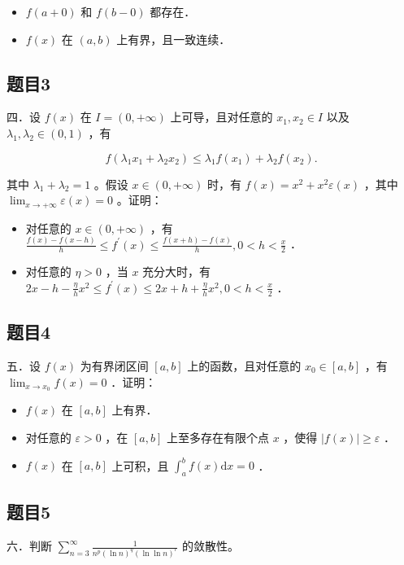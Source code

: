 \documentclass{article}
\begin{document}
\begin{itemize}
  \item[（1）] \(f(a+0)\) 和 \(f(b-0)\) 都存在．
  \item[（2）] \(f(x)\) 在 \((a, b)\) 上有界，且一致连续．
\end{itemize}

\subsection{题目3}
四．设 \(f(x)\) 在 \(I=(0,+\infty)\) 上可导，且对任意的 \(x_{1}, x_{2} \in I\) 以及 \(\lambda_{1}, \lambda_{2} \in(0,1)\) ，有

\[
f\left(\lambda_{1} x_{1}+\lambda_{2} x_{2}\right) \leq \lambda_{1} f\left(x_{1}\right)+\lambda_{2} f\left(x_{2}\right) .
\]

其中 \(\lambda_{1}+\lambda_{2}=1\) 。假设 \(x \in(0,+\infty)\) 时，有 \(f(x)=x^{2}+x^{2} \varepsilon(x)\) ，其中 \(\lim _{x \rightarrow+\infty} \varepsilon(x)=0\) 。证明：

\begin{itemize}
  \item[（1）] 对任意的 \(x \in(0,+\infty)\) ，有 \(\frac{f(x)-f(x-h)}{h} \leq f^{\prime}(x) \leq \frac{f(x+h)-f(x)}{h}, 0<h<\frac{x}{2}\) ．
  \item[（2）] 对任意的 \(\eta>0\) ，当 \(x\) 充分大时，有 \(2 x-h-\frac{\eta}{h} x^{2} \leq f^{\prime}(x) \leq 2 x+h+\frac{\eta}{h} x^{2}, 0<h<\frac{x}{2}\) ．
\end{itemize}

\subsection{题目4}
五．设 \(f(x)\) 为有界闭区间 \([a, b]\) 上的函数，且对任意的 \(x_{0} \in[a, b]\) ，有 \(\lim _{x \rightarrow x_{0}} f(x)=0\) ．证明：

\begin{itemize}
  \item[（1）] \(f(x)\) 在 \([a, b]\) 上有界．
  \item[（2）] 对任意的 \(\varepsilon>0\) ，在 \([a, b]\) 上至多存在有限个点 \(x\) ，使得 \(|f(x)| \geq \varepsilon\) ．
  \item[（3）] \(f(x)\) 在 \([a, b]\) 上可积，且 \(\int_{a}^{b} f(x) \mathrm{d} x=0\) ．
\end{itemize}

\subsection{题目5}
六．判断 \(\sum_{n=3}^{\infty} \frac{1}{n^{p}(\ln n)^{q}(\ln \ln n)^{r}}\) 的敛散性。
\end{document}
